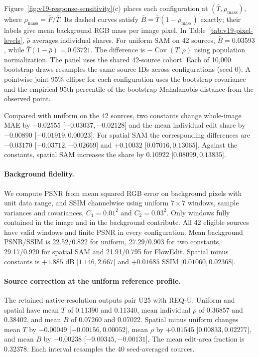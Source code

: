 Figure~\ref{fig:v19-response-sensitivity}(c) places each configuration at $(\bar T,\rho_{\mathrm{mass}})$, where $\rho_{\mathrm{mass}}=\bar F/\bar T$. Its dashed curves satisfy $\bar B=\bar T(1-\rho_{\mathrm{mass}})$ exactly; their labels give mean background RGB mass per image pixel. In Table~\ref{tab:v19-pixel-levels}, $\bar\rho$ averages individual shares. For uniform SAM on 42 sources, $\bar B=0.03593$, while $\bar T(1-\bar\rho)=0.03721$. The difference is $-\operatorname{Cov}(T,\rho)$ using population normalization. The panel uses the shared 42-source cohort. Each of 10,000 bootstrap draws resamples the same source IDs across configurations (seed 0). A pointwise joint 95\% ellipse for each configuration uses the bootstrap covariance and the empirical 95th percentile of the bootstrap Mahalanobis distance from the observed point.

Compared with uniform on the 42 sources, two constants change whole-image MAE by $-0.02555$ [$-0.03037,-0.02128$] and the mean individual edit share by $-0.00890$ [$-0.01919,0.00023$]. For spatial SAM the corresponding differences are $-0.03170$ [$-0.03712,-0.02669$] and $+0.10032$ [$0.07016,0.13065$]. Against the constants, spatial SAM increases the share by $0.10922$ [$0.08099,0.13835$].

\paragraph{Background fidelity.}
We compute PSNR from mean squared RGB error on background pixels with unit data range, and SSIM channelwise using uniform $7\times7$ windows, sample variances and covariances, $C_1=0.01^2$ and $C_2=0.03^2$. Only windows fully contained in the image and in the background contribute. All 42 eligible sources have valid windows and finite PSNR in every configuration. Mean background PSNR/SSIM is 22.52/0.822 for uniform, 27.29/0.903 for two constants, 29.17/0.920 for spatial SAM and 21.91/0.795 for FlowEdit. Spatial minus constants is $+1.885$ dB [$1.146,2.667$] and $+0.01685$ SSIM [$0.01060,0.02368$].

\paragraph{Source correction at the uniform reference profile.}
The retained native-resolution outputs pair U25 with REQ-U. Uniform and spatial have mean $T$ of 0.11390 and 0.11340, mean individual $\rho$ of 0.36857 and 0.38402, and mean $B$ of 0.07260 and 0.07022. Spatial minus uniform changes mean $T$ by $-0.00049$ [$-0.00156,0.00052$], mean $\rho$ by $+0.01545$ [$0.00833,0.02277$], and mean $B$ by $-0.00238$ [$-0.00345,-0.00131$]. The mean edit-area fraction is 0.32378. Each interval resamples the 40 seed-averaged sources.

